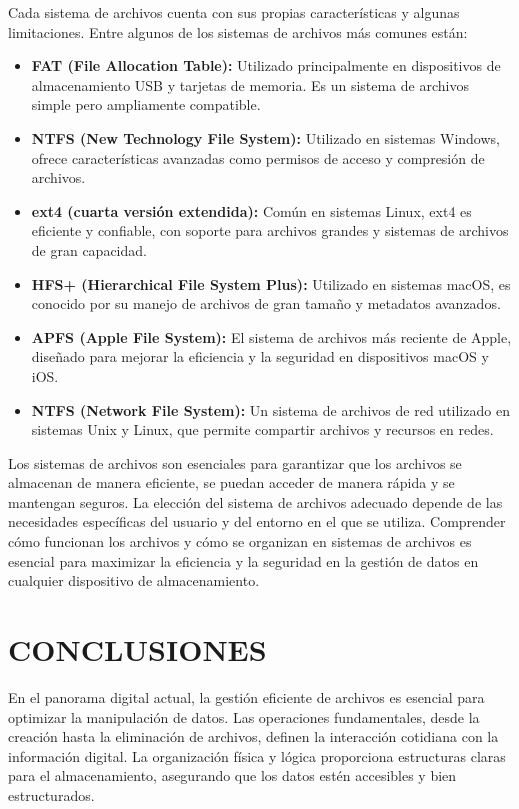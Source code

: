 \documentclass[11pt, twocolumn]{article}
\begin{document}
  Cada sistema de archivos cuenta con sus propias características y algunas limitaciones. Entre algunos de los sistemas de archivos más comunes están:

  \begin{itemize}
    \item \textbf{FAT (File Allocation Table):} Utilizado principalmente en dispositivos de almacenamiento USB y tarjetas de memoria. Es un sistema de archivos simple pero ampliamente compatible.
    \item \textbf{NTFS (New Technology File System):} Utilizado en sistemas Windows, ofrece características avanzadas como permisos de acceso y compresión de archivos.
    \item \textbf{ext4 (cuarta versión extendida):} Común en sistemas Linux, ext4 es eficiente y confiable, con soporte para archivos grandes y sistemas de archivos de gran capacidad.
    \item	\textbf{HFS+ (Hierarchical File System Plus):} Utilizado en sistemas macOS, es conocido por su manejo de archivos de gran tamaño y metadatos avanzados.
    \item \textbf{APFS (Apple File System):} El sistema de archivos más reciente de Apple, diseñado para mejorar la eficiencia y la seguridad en dispositivos macOS y iOS.
    \item \textbf{NTFS (Network File System):} Un sistema de archivos de red utilizado en sistemas Unix y Linux, que permite compartir archivos y recursos en redes.
  \end{itemize}
  
  Los sistemas de archivos son esenciales para garantizar que los archivos se almacenan de manera eficiente, se puedan acceder de manera rápida y se mantengan seguros. La elección del sistema de archivos adecuado depende de las necesidades específicas del usuario y del entorno en el que se utiliza. Comprender cómo funcionan los archivos y cómo se organizan en sistemas de archivos es esencial para maximizar la eficiencia y la seguridad en la gestión de datos en cualquier dispositivo de almacenamiento.


  \section{CONCLUSIONES}
  En el panorama digital actual, la gestión eficiente de archivos es esencial para optimizar la manipulación de datos. Las operaciones fundamentales, desde la creación hasta la eliminación de archivos, definen la interacción cotidiana con la información digital. La organización física y lógica proporciona estructuras claras para el almacenamiento, asegurando que los datos estén accesibles y bien estructurados.
\end{document}

